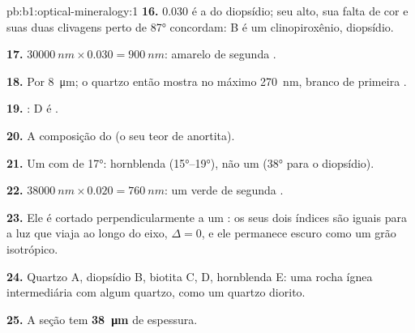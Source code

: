 \begin{solution}{pb:b1:optical-mineralogy:1}
\textbf{16.} $0.030$ é a  do diopsídio; seu  alto, sua falta de cor e suas duas clivagens perto de \ang{87} concordam: B é um clinopiroxênio, diopsídio.

\textbf{17.} $\qty{30000}{nm}\times0.030 = \qty{900}{nm}$: amarelo de segunda .

\textbf{18.} Por \qty{8}{\micro m}; o quartzo então mostra no máximo \qty{270}{nm}, branco de primeira .

\textbf{19.} : D é .

\textbf{20.} A composição do  (o seu teor de anortita).

\textbf{21.} Um  com  de \ang{17}: hornblenda
(\ang{15}--\ang{19}), não um  (\ang{38} para o diopsídio).

\textbf{22.} $\qty{38000}{nm}\times0.020 = \qty{760}{nm}$: um verde de segunda .

\textbf{23.} Ele é cortado perpendicularmente a um : os seus dois índices são iguais para a luz que viaja ao longo do eixo, $\Delta = 0$, e ele permanece escuro como um grão isotrópico.

\textbf{24.} Quartzo A, diopsídio B, biotita C,  D, hornblenda E: uma rocha ígnea intermediária com algum quartzo, como um quartzo diorito.

\textbf{25.} A seção tem \textbf{\qty[text-series-to-math=true]{38}{\micro m}} de espessura.
\end{solution}
